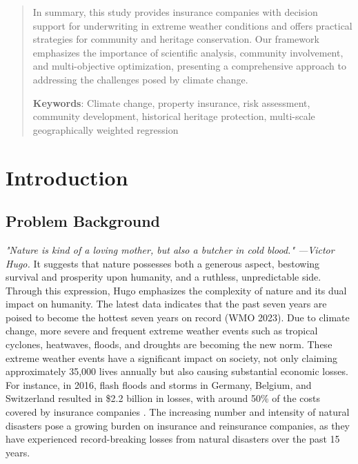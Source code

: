 \documentclass[12pt]{article}
\begin{document}
\begin{abstract}
In summary, this study provides insurance companies with decision support for underwriting in extreme weather conditions and offers practical strategies for community and heritage conservation. Our framework emphasizes the importance of scientific analysis, community involvement, and multi-objective optimization, presenting a comprehensive approach to addressing the challenges posed by climate change.

\textbf{Keywords}: Climate change, property insurance, risk assessment, community development, historical heritage protection, multi-scale geographically weighted regression
\end{abstract}

\clearpage{
\fontsize{10}{11}\selectfont
\pagestyle{fancy}
\tableofcontents }
\newpage
\setcounter{page}{1}


\section{Introduction}
\subsection{Problem Background}
\textit{"Nature is kind of a loving mother, but also a butcher in cold blood." —Victor Hugo.} It suggests that nature possesses both a generous aspect, bestowing survival and prosperity upon humanity, and a ruthless, unpredictable side. Through this expression, Hugo emphasizes the complexity of nature and its dual impact on humanity.
The latest data indicates that the past seven years are poised to become the hottest seven years on record (WMO 2023). Due to climate change, more severe and frequent extreme weather events such as tropical cyclones, heatwaves, floods, and droughts are becoming the new norm. These extreme weather events have a significant impact on society, not only claiming approximately 35,000 lives annually but also causing substantial economic losses. For instance, in 2016, flash floods and storms in Germany, Belgium, and Switzerland resulted in \$2.2 billion in losses, with around 50\% of the costs covered by insurance companies \cite{hudson2020assessment}. The increasing number and intensity of natural disasters pose a growing burden on insurance and reinsurance companies, as they have experienced record-breaking losses from natural disasters over the past 15 years.
\end{document}
